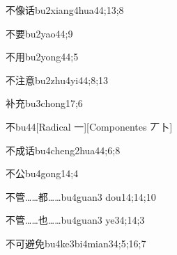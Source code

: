 \begin{verbete}{不像话}{bu2xiang4hua4}{4;13;8}
\end{verbete}

\begin{verbete}{不要}{bu2yao4}{4;9}
\end{verbete}

\begin{verbete}{不用}{bu2yong4}{4;5}
\end{verbete}

\begin{verbete}{不注意}{bu2zhu4yi4}{4;8;13}
\end{verbete}

\begin{verbete}{补充}{bu3chong1}{7;6}
\end{verbete}

\begin{verbete}{不}{bu4}{4}[Radical 一][Componentes 丆卜]
\end{verbete}

\begin{verbete}{不成话}{bu4cheng2hua4}{4;6;8}
\end{verbete}

\begin{verbete}{不公}{bu4gong1}{4;4}
\end{verbete}

\begin{verbete}{不管……都……}{bu4guan3 dou1}{4;14;10}
\end{verbete}

\begin{verbete}{不管……也……}{bu4guan3 ye3}{4;14;3}
\end{verbete}

\begin{verbete}{不可避免}{bu4ke3bi4mian3}{4;5;16;7}
\end{verbete}

